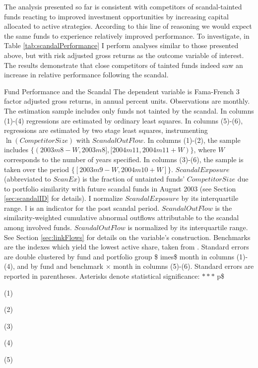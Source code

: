 \documentclass[]{book}
\theoremstyle{definition}
\theoremstyle{definition}
\theoremstyle{definition}
\theoremstyle{remark}
\begin{document}
The analysis presented so far is consistent with competitors of
scandal-tainted funds reacting to improved investment opportunities by
increasing capital allocated to active strategies. According to this
line of reasoning we would expect the same funds to experience
relatively improved performance. To investigate, in Table
\ref{tab:scandalPerformance} I perform analyses similar to those
presented above, but with risk adjusted gross returns as the outcome
variable of interest. The results demonstrate that close competitors of
tainted funds indeed saw an increase in relative performance following
the scandal.

\label{tab:scandalPerformance}Fund Performance and the Scandal The dependent
variable is Fama-French 3 factor adjusted gross returns, in annual
percent units. Observations are monthly. The estimation sample includes
only funds not tainted by the scandal. In columns (1)-(4) regressions
are estimated by ordinary least squares. In columns (5)-(6), regressions
are estimated by two stage least squares, instrumenting
\(\ln(CompetitorSize)\) with \(ScandalOutFlow\). In columns (1)-(2), the
sample includes \(\{(2003m8-W, 2003m8], [2004m11,2004m11+W) \}\), where
\(W\) corresponds to the number of years specified. In columns (3)-(6),
the sample is taken over the period \(\{[2003m9-W, 2004m10+W] \}\).
\(ScandalExposure\) (abbreviated to \(ScanEx\)) is the fraction of
untainted funds' \(CompetitorSize\) due to portfolio similarity with
future scandal funds in August 2003 (see Section \ref{sec:scandalID} for
details). I normalize \(ScandalExposure\) by its interquartile range.
\(\mathbb{I}\) is an indicator for the post scandal period.
\(ScandalOutFlow\) is the similarity-weighted cumulative abnormal
outflows attributable to the scandal among involved funds.
\(ScandalOutFlow\) is normalized by its interquartile range. See Section
\ref{sec:linkFlows} for details on the variable's construction.
Benchmarks are the indexes which yield the lowest active share, taken
from \citet{petajisto13}. Standard errors are double clustered by fund
and portfolio group \$ imes\$ month in columns (1)-(4), and by fund and
benchmark \(\times\) month in columns (5)-(6). Standard errors are
reported in parentheses. Asterisks denote statistical significance:
\(\ast\ast\ast\) p\$

\left(1\right)

\left(2\right)

\left(3\right)

\left(4\right)

\left(5\right)
\end{document}
